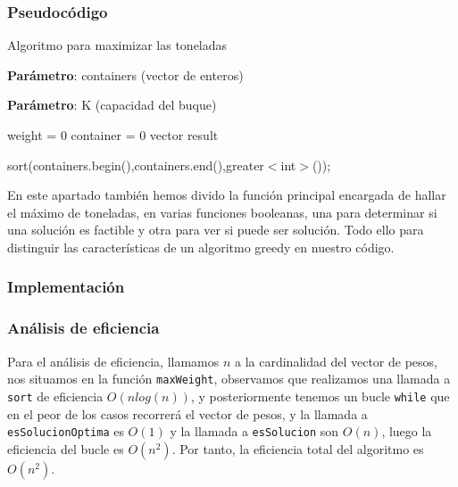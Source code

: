 \subsubsection{Pseudocódigo}

\begin{algorithm}[H]
    \caption{Algoritmo para maximizar las toneladas}\label{alg:max_toneladas}
    \begin{minipage}{0.92\textwidth}

    \textbf{Parámetro}: containers (vector de enteros)

    \textbf{Parámetro}: K (capacidad del buque)

    \end{minipage}

    weight = 0\;
	container = 0\;
    vector result\;
  
    sort(containers.begin(),containers.end(),greater$<$int$>$());

  

\end{algorithm}

En este apartado también hemos divido la función principal encargada de hallar el máximo de toneladas, en varias funciones
booleanas, una para determinar si una solución es factible y otra para ver si puede ser solución. Todo ello para distinguir 
las características de un algoritmo greedy en nuestro código.

\subsubsection{Implementación}



\subsubsection{Análisis de eficiencia}

Para el análisis de eficiencia, llamamos $n$ a la cardinalidad del vector de pesos, nos situamos en la función \texttt{maxWeight}, observamos que realizamos una llamada a \texttt{sort} de eficiencia $O(nlog(n))$, y posteriormente tenemos un bucle \texttt{while} que en el peor de los casos recorrerá el vector de pesos, y la llamada a \texttt{esSolucionOptima} es $O(1)$ y la llamada a \texttt{esSolucion} son $O(n)$, luego la eficiencia del bucle es $O(n^2)$. Por tanto, la eficiencia total del algoritmo es $O(n^2)$.




